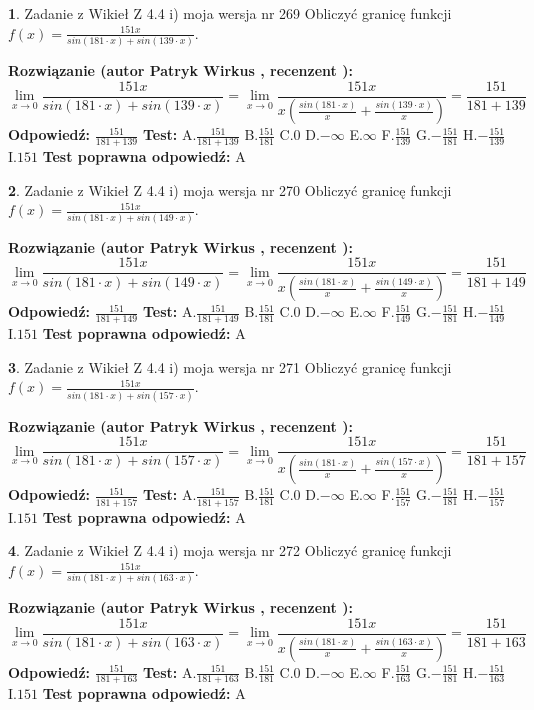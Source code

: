 \documentclass[12pt, a4paper]{article}
\theoremstyle{definition} %
\newtheorem{zad}{}
\newcommand{\zadStart}[1]{\begin{zad}#1\newline}
\newcommand{\zadStop}{\end{zad}}
\newcommand{\rozwStart}[2]{\noindent \textbf{Rozwiązanie (autor #1 , recenzent #2): }\newline}
\newcommand{\rozwStop}{\newline}
\newcommand{\odpStart}{\noindent \textbf{Odpowiedź:}\newline}
\newcommand{\odpStop}{\newline}
\newcommand{\testStart}{\noindent \textbf{Test:}\newline}
\newcommand{\testStop}{\newline}
\newcommand{\kluczStart}{\noindent \textbf{Test poprawna odpowiedź:}\newline}
\newcommand{\kluczStop}{\newline}
\begin{document}
\zadStart{Zadanie z Wikieł Z 4.4 i) moja wersja nr 269}
Obliczyć granicę funkcji $f(x)=\frac{151x}{sin(181\cdot x) +sin(139\cdot x)}$.
\zadStop
\rozwStart{Patryk Wirkus}{}
$$\lim\limits_{x\to 0}\frac{151x}{sin(181\cdot x) +sin(139\cdot x)}=\lim\limits_{x\to 0}\frac{151x}{x(\frac{sin(181\cdot x)}{x}+\frac{sin(139\cdot x)}{x})}=\frac{151}{181+139}$$
\rozwStop
\odpStart
$\frac{151}{181+139}$
\odpStop
\testStart
A.$\frac{151}{181+139}$
B.$\frac{151}{181}$
C.$0$
D.$-\infty$
E.$\infty$
F.$\frac{151}{139}$
G.$-\frac{151}{181}$
H.$-\frac{151}{139}$
I.$151$
\testStop
\kluczStart
A
\kluczStop



\zadStart{Zadanie z Wikieł Z 4.4 i) moja wersja nr 270}
Obliczyć granicę funkcji $f(x)=\frac{151x}{sin(181\cdot x) +sin(149\cdot x)}$.
\zadStop
\rozwStart{Patryk Wirkus}{}
$$\lim\limits_{x\to 0}\frac{151x}{sin(181\cdot x) +sin(149\cdot x)}=\lim\limits_{x\to 0}\frac{151x}{x(\frac{sin(181\cdot x)}{x}+\frac{sin(149\cdot x)}{x})}=\frac{151}{181+149}$$
\rozwStop
\odpStart
$\frac{151}{181+149}$
\odpStop
\testStart
A.$\frac{151}{181+149}$
B.$\frac{151}{181}$
C.$0$
D.$-\infty$
E.$\infty$
F.$\frac{151}{149}$
G.$-\frac{151}{181}$
H.$-\frac{151}{149}$
I.$151$
\testStop
\kluczStart
A
\kluczStop



\zadStart{Zadanie z Wikieł Z 4.4 i) moja wersja nr 271}
Obliczyć granicę funkcji $f(x)=\frac{151x}{sin(181\cdot x) +sin(157\cdot x)}$.
\zadStop
\rozwStart{Patryk Wirkus}{}
$$\lim\limits_{x\to 0}\frac{151x}{sin(181\cdot x) +sin(157\cdot x)}=\lim\limits_{x\to 0}\frac{151x}{x(\frac{sin(181\cdot x)}{x}+\frac{sin(157\cdot x)}{x})}=\frac{151}{181+157}$$
\rozwStop
\odpStart
$\frac{151}{181+157}$
\odpStop
\testStart
A.$\frac{151}{181+157}$
B.$\frac{151}{181}$
C.$0$
D.$-\infty$
E.$\infty$
F.$\frac{151}{157}$
G.$-\frac{151}{181}$
H.$-\frac{151}{157}$
I.$151$
\testStop
\kluczStart
A
\kluczStop



\zadStart{Zadanie z Wikieł Z 4.4 i) moja wersja nr 272}
Obliczyć granicę funkcji $f(x)=\frac{151x}{sin(181\cdot x) +sin(163\cdot x)}$.
\zadStop
\rozwStart{Patryk Wirkus}{}
$$\lim\limits_{x\to 0}\frac{151x}{sin(181\cdot x) +sin(163\cdot x)}=\lim\limits_{x\to 0}\frac{151x}{x(\frac{sin(181\cdot x)}{x}+\frac{sin(163\cdot x)}{x})}=\frac{151}{181+163}$$
\rozwStop
\odpStart
$\frac{151}{181+163}$
\odpStop
\testStart
A.$\frac{151}{181+163}$
B.$\frac{151}{181}$
C.$0$
D.$-\infty$
E.$\infty$
F.$\frac{151}{163}$
G.$-\frac{151}{181}$
H.$-\frac{151}{163}$
I.$151$
\testStop
\kluczStart
A
\kluczStop
\end{document}
